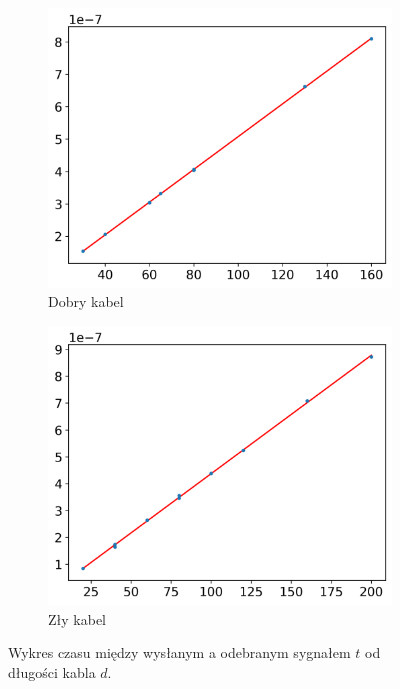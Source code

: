 \documentclass[12pt]{article}
\begin{document}
\begin{figure}[H]
	\centering
	\begin{subfigure}{0.45\textwidth}
		\includegraphics[width=\linewidth]{good_cable_distance}
		\caption{Dobry kabel}
		\label{fig:good_distance}
	\end{subfigure}\hfill
	\begin{subfigure}{0.45\textwidth}
		\includegraphics[width=\linewidth]{bad_cable_distance}
		\caption{Zły kabel}
		\label{fig:bad_distance}
	\end{subfigure}
	\caption{Wykres czasu między wysłanym a odebranym sygnałem \(t\) od długości kabla \(d\).}
	\label{fig:distance}
\end{figure}
\end{document}
